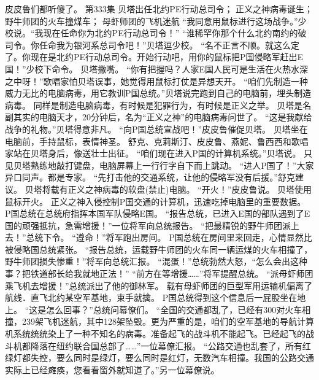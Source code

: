 \documentclass[a4paper,12pt,UTF8,twoside]{ctexbook}
\begin{document}
        皮皮鲁们都听傻了。          第333集  
        贝塔出任北约PE行动总司令；  
        正义之神病毒诞生；  
        野牛师团的火车撞煤车；  
        母虾师团的飞机迷航    
        “我同意用鼠标进行这场战争。”少校说。“我现在任命你为北约PE行动总司令！”  
        “谁稀罕你那个什么北约南约的破司令。你任命我为银河系总司令吧！”贝塔逗少校。  
        “名不正言不顺。就这么定了。你现在是北约PE行动总司令。开始行动吧，用你的鼠标把P国侵略军赶出E国！”少校下命令。  
        贝塔撇嘴。  
        “你有把握吗？人家E国人民可是生活在火热水深之中呀！”歌唱家怕贝塔误事，她觉得用鼠标打仗是异想天开。        
        “咱们先制造一种威力无比的电脑病毒，用它教训P国总统。”贝塔说完跑到自己的电脑前，埋头制造病毒。  
        同样是制造电脑病毒，有时候是犯罪行为，有时候是正义之举。  
        贝塔是名副其实的电脑天才，20分钟后，名为“正义之神”的电脑病毒问世了。  
        “这是我献给战争的礼物。”贝塔得意非凡。  
        “向P国总统宣战吧！”皮皮鲁催促贝塔。  
        贝塔坐在电脑前，手持鼠标，表情神圣。  
        舒克、克莉斯汀、皮皮鲁、燕妮、鲁西西和歌唱家站在贝塔身后，像送壮士出征。  
        “咱们现在进入P国的计算机系统。”贝塔说。  
        只见贝塔熟练地敲打键盘，电脑屏幕上一行行字自下而上跳动。  
        “进人P国了！”大家异口同声。都是专家。  
        “先打击他的交通系统，让他的侵略军没有后援。”舒克建议。  
        贝塔将载有正义之神病毒的软盘(禁止)电脑。  
        “开火！”皮皮鲁说。  
        贝塔使用鼠标开火。  
        正义之神入侵控制P国交通的计算机，迅速吃掉电脑里的重要数据。        
        P国总统在总统府指挥本国军队侵略E国。  
        “报告总统，已进入E国的部队遇到了E国的顽强抵抗，急需增援！”一位将军向总统报告。  
        “把最精锐的野牛师团派上去！”总统下令。  
        “遵命！”将军跑出房间。  
        P国总统在房间里来回走，心情显然比被侵略国总统紧张。  
        “报告总统，运载野牛师团的火车同一辆运煤的火车相撞了，野牛师团损失惨重！”将军向总统汇报。  
        “混蛋！”总统勃然大怒，“怎么会出这种事？把铁道部长给我就地正法！”  
        “前方在等增援……”将军提醒总统。  
        “派母虾师团乘飞机去增援！”总统派出了他的御林军。  
        载有母虾师团的巨型军用运输机偏离了航线．直飞北约某空军基地，束手就擒。  
        P国总统得到这个信息后一屁股坐在地上。  
        “这是怎么回事？”总统问幕僚们。  
        “全国的交通都乱了，已经有300对火车相撞，239架飞机迷航，其中128架坠毁。更为严重的是，咱们的空军基地的导航计算机系统统统染上了一种不知名的病毒。准备起飞的战斗机不能起飞。已经起飞的战斗机都降落在纽约联合国总部了……”一位幕僚汇报。  
        “公路交通也乱套了，所有红绿灯都失控，要么同时是绿灯，要么同时是红灯，无数汽车相撞。我国的公路交通实际上已经瘫痪，您看看窗外就知道了。”另一位幕僚说。  
\end{document}
